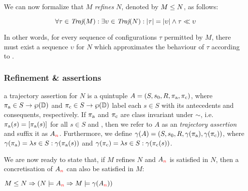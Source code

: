 

We can now formalize that $M$ \textit{refines} $N$, denoted by $M \leq N$, as follows:

\begin{equation*}
\forall \tau \in \operatorname{\textit{Traj}}(M) : \exists \upsilon \in \operatorname{\textit{Traj}}(N) : | \tau | = | \upsilon | \wedge \tau \ll \upsilon
\end{equation*}

\noindent In other words, for every sequence of configurations $\tau$ permitted by $M$, there must exist a sequence $\upsilon$ for $N$ which approximates the behaviour of $\tau$ according to . 

\subsubsection{Refinement \& assertions}

 a trajectory assertion for $N$ is a quintuple $A = (S, s_{0}, R, \operatorname{\pi_{\textrm{a}}}, \operatorname{\pi_{\textrm{c}}})$, where $\operatorname{\pi_{\textrm{a}}} \in S \rightarrow \wp(\mathbb{D})$ and $\operatorname{\pi_{\textrm{c}}} \in S \rightarrow \wp(\mathbb{D})$ label each $s \in S$ with its antecedents and consequents, respectively. If $\operatorname{\pi_{\textrm{a}}}$ and $\operatorname{\pi_{\textrm{c}}}$ are class invariant under $\sim$, i.e. $\operatorname{\pi_{\textrm{a}}}(s) = [\operatorname{\pi_{\textrm{a}}}(s)]$ for all $s \in S$ and , then we refer to $A$ as an \textit{ trajectory assertion} and suffix it as $A_{\textcolor{red}{n}}$. Furthermore, we define $\gamma(A) = (S, s_{0}, R, \gamma(\operatorname{\pi_{\textrm{a}}}), \gamma(\operatorname{\pi_{\textrm{c}}}))$, where $\gamma(\operatorname{\pi_{\textrm{a}}}) = \lambda s \in S : \gamma(\operatorname{\pi_{\textrm{a}}}(s))$ and $\gamma(\operatorname{\pi_{\textrm{c}}}) = \lambda s \in S : \gamma(\operatorname{\pi_{\textrm{c}}}(s))$.


We are now ready to state that, if $M$ refines $N$ and $A_{\textcolor{red}{n}}$ is satisfied in $N$, then a concretisation of $A_{\textcolor{red}{n}}$ can also be satisfied in $M$:

\begin{theorem} \label{thm:traj-refines}
$M \leq N \Rightarrow (N \models A_{\textcolor{red}{n}} \Rightarrow M \models \gamma(A_{\textcolor{red}{n}}))$
\end{theorem}

